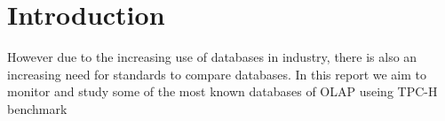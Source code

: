 \documentclass[main.tex]{subfiles}
\begin{document}
    \section{Introduction}
    However due to the increasing use of databases in industry, there is also an increasing need for standards to compare databases. In this report we aim to monitor and study some of the most known databases of OLAP useing TPC-H benchmark
\end{document}

